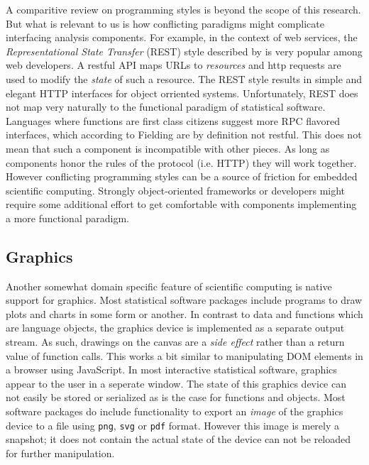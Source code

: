 \documentclass{article}
\begin{document}
A comparitive review on programming styles is beyond the scope of this research. But what is relevant to us is how conflicting paradigms might complicate interfacing analysis components. For example, in the context of web services, the \emph{Representational State Transfer} (REST) style described by \cite{fielding2000architectural} is very popular among web developers. A restful API maps URLs to \emph{resources} and http requests are used to modify the \emph{state} of such a resource. The REST style results in simple and elegant HTTP interfaces for object orriented systems. Unfortunately, REST does not map very naturally to the functional paradigm of statistical software. Languages where functions are first class citizens suggest more RPC flavored interfaces, which according to Fielding are by definition not restful. This does not mean that such a component is incompatible with other pieces. As long as components honor the rules of the protocol (i.e. HTTP) they will work together. However conflicting programming styles can be a source of friction for embedded scientific computing. Strongly object-oriented frameworks or developers might require some additional effort to get comfortable with components implementing a more functional paradigm.



\subsection{Graphics}

Another somewhat domain specific feature of scientific computing is native support for graphics. Most statistical software packages include programs to draw plots and charts in some form or another. In contrast to data and functions which are language objects, the graphics device is implemented as a separate output stream. As such, drawings on the canvas are a \emph{side effect} rather than a return value of function calls. This works a bit similar to manipulating DOM elements in a browser using JavaScript. In most interactive statistical software, graphics appear to the user in a seperate window. The state of this graphics device can not easily be stored or serialized as is the case for functions and objects. Most software packages do include functionality to export an \emph{image} of the graphics device to a file using \texttt{png}, \texttt{svg} or \texttt{pdf} format. However this image is merely a snapshot; it does not contain the actual state of the device can not be reloaded for further manipulation.
\end{document}
